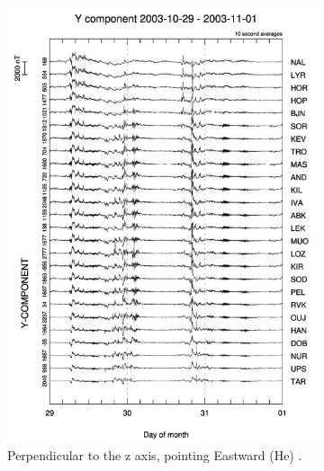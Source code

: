 \begin{figure}[H]
\begin{subfigure}[b]{0.33\textwidth}
                \includegraphics[width=\linewidth]{figures/IMAGE_Y_gram.jpg}
                \caption{Perpendicular to the z axis, pointing Eastward (He) \cite{image}.}
				\label{fig:image_y_gram}
        \end{subfigure}%
        \begin{subfigure}[b]{0.33\textwidth}

\end{subfigure}
\end{figure}
